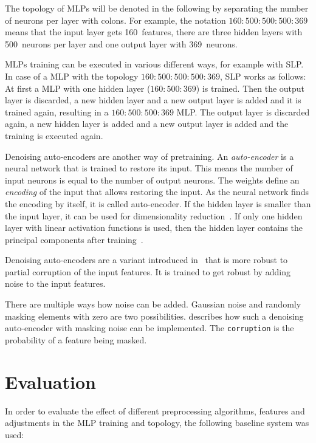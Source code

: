 \documentclass[9pt,technote]{IEEEtran}
\begin{document}
The topology of \glspl{MLP} will be denoted in the following by separating the
number of neurons per layer with colons. For example, the notation
$160{:}500{:}500{:}500{:}369$ means that the input layer gets 160~features,
there are three hidden layers with 500~neurons per layer and one output layer
with 369~neurons.

\glspl{MLP} training can be executed in various different ways, for example
with \gls{SLP}. In case of a \gls{MLP} with the topology
$160{:}500{:}500{:}500{:}369$, \gls{SLP} works as follows: At first a \gls{MLP}
with one hidden layer ($160{:}500{:}369$) is trained. Then the output layer is
discarded, a new hidden layer and a new output layer is added and it is trained
again, resulting in a $160{:}500{:}500{:}369$ \gls{MLP}. The output layer is
discarded again, a new hidden layer is added and a new output layer is added
and the training is executed again.

Denoising auto-encoders are another way of pretraining. An
\textit{auto-encoder} is a neural network that is trained to restore its input.
This means the number of input neurons is equal to the number of output
neurons. The weights define an \textit{encoding} of the input that allows
restoring the input. As the neural network finds the encoding by itself, it is
called auto-encoder. If the hidden layer is smaller than the input layer, it
can be used for dimensionality reduction~\cite{Hinton1989}. If only one hidden
layer with linear activation functions is used, then the hidden layer contains
the principal components after training~\cite{Duda2001}.

Denoising auto-encoders are a variant introduced in~\cite{Vincent2008} that
is more robust to partial corruption of the input features. It is trained to
get robust by adding noise to the input features.

There are multiple ways how noise can be added. Gaussian noise and
randomly masking elements with zero are two possibilities. \cite{Deeplearning-Denoising-AE}
describes how such a denoising auto-encoder with masking noise can be
implemented. The \texttt{corruption} is the probability of a feature being
masked.

\section{Evaluation}\label{ch:Evaluation}
In order to evaluate the effect of different preprocessing algorithms, features
and adjustments in the \gls{MLP} training and topology, the following baseline
system was used:
\end{document}
